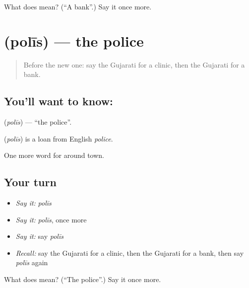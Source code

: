 \begin{tcolorbox}[breakable,colback=teal!4,colframe=teal!35!black,title={Before you move on}]
What does  mean? (\textquotedblleft{}A bank\textquotedblright{}.) Say it once more.
\end{tcolorbox}
\section[\texorpdfstring{\gu{પોલીસ} (polīs)}{પોલીસ (polīs)}]{ (polīs) — the police}

\label{lesson:GU-C84-police}



\begin{quote}
Before the new one: say the Gujarati for a clinic, then the Gujarati for a bank.
\end{quote}

\subsection*{You'll want to know: }
\textbf{} (\emph{polīs}) — \textquotedblleft{}the police\textquotedblright{}.

\begin{cousinweb}
\textbf{} (\emph{polīs}) is a loan from English \emph{police}.
\end{cousinweb}

\begin{grammarlens}[title={What you've built}]
One more word for around town.
\end{grammarlens}

\subsection*{Your turn}
\begin{itemize}
\raggedright
  \item \emph{Say it:} \emph{polīs}
  \item \emph{Say it:} \emph{polīs}, once more
  \item \emph{Say it:} say \emph{polīs}
  \item \emph{Recall:} say the Gujarati for a clinic, then the Gujarati for a bank, then say \emph{polīs} again
\end{itemize}

\begin{tcolorbox}[breakable,colback=teal!4,colframe=teal!35!black,title={Before you move on}]
What does  mean? (\textquotedblleft{}The police\textquotedblright{}.) Say it once more.
\end{tcolorbox}
